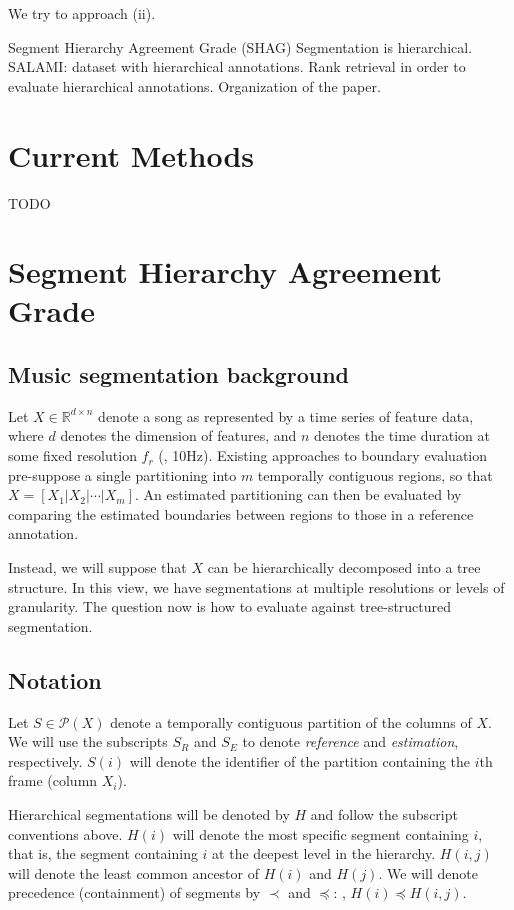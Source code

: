 \documentclass{article}
\begin{document}
We try to approach (ii).

  Segment Hierarchy Agreement Grade (SHAG)
Segmentation is hierarchical.
SALAMI: dataset with hierarchical annotations.
Rank retrieval in order to evaluate hierarchical annotations.
Organization of the paper.

\section{Current Methods}

TODO

\section{Segment Hierarchy Agreement Grade}\label{sec:eval_desc}

\subsection{Music segmentation background}

Let $X \in \mathbb{R}^{d\times n}$ denote a song as represented by a time series of 
feature data, where $d$ denotes the dimension of features, and $n$ denotes the
time duration at some fixed resolution $f_r$ (\eg, 10Hz).
Existing approaches to boundary evaluation pre-suppose a single partitioning into $m$
temporally contiguous regions, so that $X=[X_1|X_2|\cdots|X_m]$.  An estimated
partitioning can then be evaluated by comparing the estimated boundaries between
regions to those in a reference annotation.

Instead, we will suppose that $X$ can be hierarchically decomposed into a tree structure.
In this view, we have segmentations at multiple resolutions or levels of granularity.
The question now is how to evaluate against tree-structured segmentation.

\subsection{Notation}

Let $S \in \mathcal{P}(X)$ denote a temporally contiguous partition of the columns of
$X$.
We will use the subscripts $S_R$ and $S_E$ to denote \emph{reference} and \emph{estimation}, respectively.
$S(i)$ will denote the identifier of the partition containing the $i$th frame (column $X_i$).

Hierarchical segmentations will be denoted by $H$ and follow the subscript conventions
above.  $H(i)$ will denote the most specific segment containing $i$, that is, the
segment containing $i$ at the deepest level in the hierarchy.
$H(i, j)$ will denote the least common ancestor of $H(i)$ and $H(j)$.
We will denote precedence (containment) of segments by $\prec$ and $\preceq$: \eg,
$H(i) \preceq H(i, j)$. 
\end{document}
